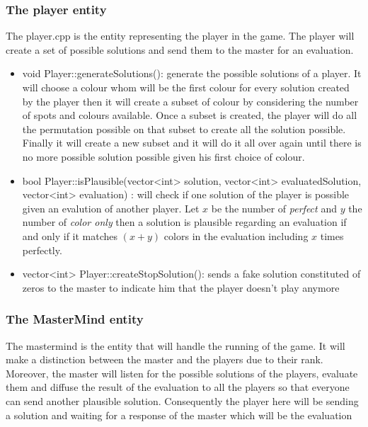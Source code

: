 \documentclass{article}
\begin{document}
\subsubsection{The player entity}
The {\selectfont player.cpp} is the entity representing the player in the game. The player will create a set of possible solutions and send them to the master for an evaluation.

\begin{itemize}
    \item {\selectfont void Player::generateSolutions()}: generate the possible solutions of a player. It will choose a colour whom will be the first colour for every solution created by the player then it will create a subset of colour by considering the number of spots and colours available. Once a subset is created, the player will do all the permutation possible on that subset to create all the solution possible. Finally it will create a new subset and it will do it all over again until there is no more possible solution possible given his first choice of colour.
    
    \item {\selectfont bool Player::isPlausible(vector<int> solution, vector<int> evaluatedSolution, \\ vector<int> evaluation)} : will check if one solution of the player is possible given an evalution of another player. Let $x$ be the number of \textit{perfect} and $y$ the number of \textit{color only} then a solution is plausible regarding an evaluation if and only if it matches $(x+y)$ colors in the evaluation including $x$ times perfectly.
    
    \item {\selectfont vector<int> Player::createStopSolution()}: sends a fake solution constituted of zeros to the master to indicate him that the player doesn't play anymore

\end{itemize}

\subsubsection{The MasterMind entity}
The mastermind is the entity that will handle the running of the game. It will make a distinction between the master and the players due to their rank. Moreover, the master will listen for the possible solutions of the players, evaluate them and diffuse the result of the evaluation to all the players so that everyone can send another plausible solution. Consequently the player here will be sending a solution and waiting for a response of the master which will be the evaluation
\end{document}
